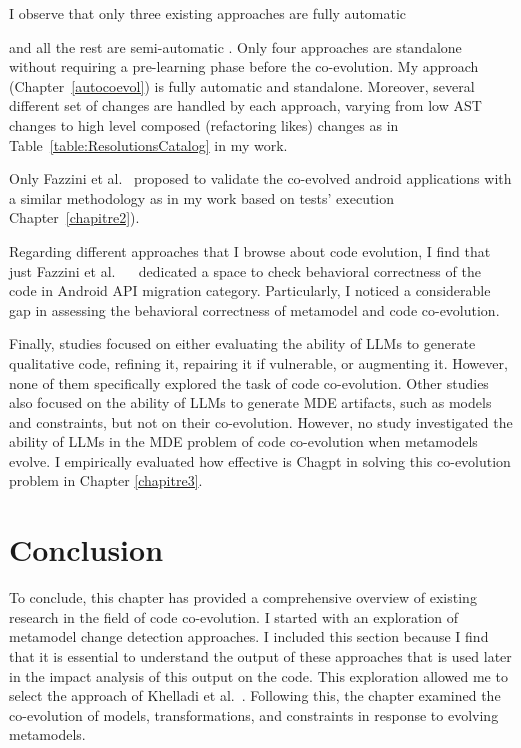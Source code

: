   I observe that only three existing approaches are fully automatic {\cite{10.1145/3387905.3388608,10.1145/3597503.3639084,8813263} and all the rest are semi-automatic \cite{9079197,10.5555/2486788.2486855,6062100,dagenais2011recommending,5070565,henkel2005catchup,10.1145/1932682.1869486,10.1145/3194793.3194798,Khelladi2020}. Only four approaches are standalone without requiring a pre-learning phase before the co-evolution.
   My approach (Chapter~\ref{autocoevol}) is fully automatic and standalone. Moreover, several different set of changes are handled by each approach, varying from low AST changes to high level composed (refactoring likes) changes as in Table~\ref{table:ResolutionsCatalog} in my work. 
   
    Only Fazzini et al.~\cite{10.1145/3387905.3388608} proposed to validate the co-evolved android applications with a similar methodology as in my work based on tests' execution Chapter~\ref{chapitre2}). 
  
 Regarding different approaches that I browse about code evolution, I find that just Fazzini et al.~ ~\cite{10.1145/3387905.3388608} dedicated a space to check behavioral correctness of the code in Android API migration category. Particularly, I noticed a considerable gap in assessing the behavioral correctness of metamodel and code co-evolution.
  
  Finally, studies focused on either evaluating the ability of LLMs to generate qualitative code, refining it, repairing it if vulnerable, or augmenting it. However, none of them specifically explored the task of code co-evolution.
  Other studies also focused on the ability of LLMs to generate MDE artifacts, such as models and constraints, but not on their co-evolution. However, no study investigated the ability of LLMs in the MDE problem of code co-evolution when metamodels evolve. I empirically evaluated how effective is Chagpt in solving this co-evolution problem in Chapter \ref{chapitre3}.
 
  \section{Conclusion}
  To conclude, this chapter has provided a comprehensive overview of existing research in the field of code co-evolution. I started with an exploration of metamodel change detection approaches. I included this section because I find that it is essential to understand the output of these approaches that is used later in the impact analysis of this output on the code. This exploration allowed me to select the approach of Khelladi et al.~\cite{khelladi2015detecting}. Following this, the chapter examined the co-evolution of models, transformations, and constraints in response to evolving metamodels.
  
}
